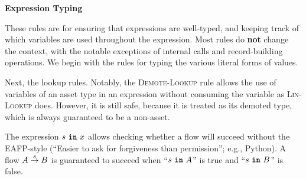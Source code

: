 \documentclass[10pt]{article}
\begin{document}
 \textbf{Expression Typing}

These rules are for ensuring that expressions are well-typed, and keeping track of which variables are used throughout the expression.
Most rules do \textbf{not} change the context, with the notable exceptions of internal calls and record-building operations.
We begin with the rules for typing the various literal forms of values.
\begin{mathpar}



\end{mathpar}

Next, the lookup rules.
Notably, the \textsc{Demote-Lookup} rule allows the use of variables of an asset type in an expression without consuming the variable as \textsc{Lin-Lookup} does.
However, it is still safe, because it is treated as its demoted type, which is always guaranteed to be a non-asset.

\begin{mathpar}


\end{mathpar}

The expression $s~\varin~x$ allows checking whether a flow will succeed without the EAFP-style (``Easier to ask for forgiveness than permission''; e.g., Python).
A flow $A \sends{s} B$ is guaranteed to succeed when ``$s~\varin~A$'' is true and ``$s~\varin~B$'' is false.
\begin{mathpar}
\end{mathpar}
\end{document}
